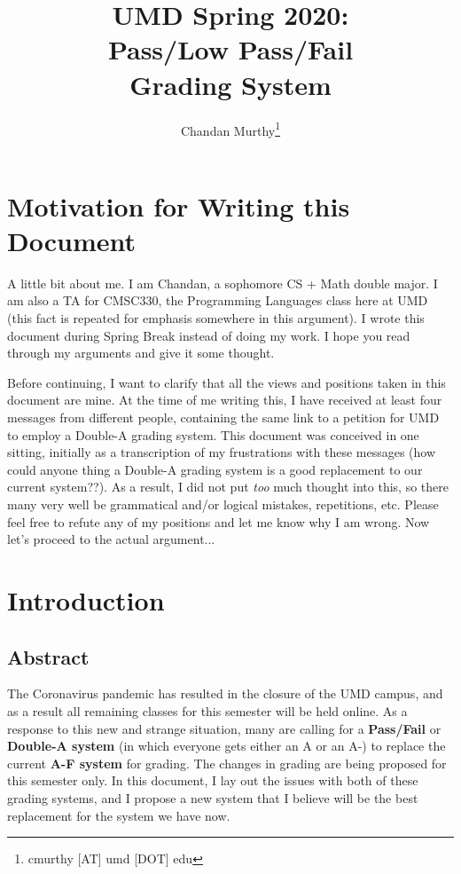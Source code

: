 \documentclass[12pt]{article}
\title{UMD Spring 2020:\\Pass/Low Pass/Fail\\Grading System}
\author{Chandan Murthy\thanks{cmurthy [AT] umd [DOT] edu}}
\begin{document}
\maketitle

\tableofcontents

\newpage
\section{Motivation for Writing this Document}
A little bit about me. I am Chandan, a sophomore CS + Math double major. I am also a TA for CMSC330, the Programming Languages class here at UMD (this fact is repeated for emphasis somewhere in this argument). I wrote this document during Spring Break instead of doing my work. I hope you read through my arguments and give it some thought.

\par Before continuing, I want to clarify that all the views and positions taken in this document are mine. At the time of me writing this, I have received at least four messages from different people, containing the same link to a petition for UMD to employ a Double-A grading system. This document was conceived in one sitting, initially as a transcription of my frustrations with these messages (how could anyone thing a Double-A grading system is a good replacement to our current system??). As a result, I did not put \textit{too} much thought into this, so there many very well be grammatical and/or logical mistakes, repetitions, etc. Please feel free to refute any of my positions and let me know why I am wrong. Now let's proceed to the actual argument...

\newpage
\section{Introduction}
\subsection{Abstract}
The Coronavirus pandemic has resulted in the closure of the UMD campus, and as a result all remaining classes for this semester will be held online. As a response to this new and strange situation, many are calling for a \textbf{Pass/Fail} or \textbf{Double-A system} (in which everyone gets either an A or an A-) to replace the current \textbf{A-F system} for grading. The changes in grading are being proposed for this semester only. In this document, I lay out the issues with both of these grading systems, and I propose a new system that I believe will be the best replacement for the system we have now.  
\end{document}
